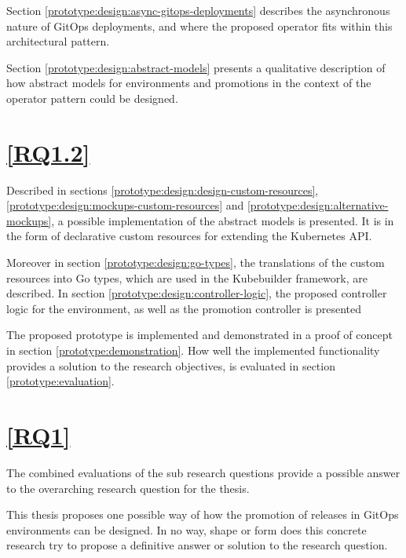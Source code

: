 Section \ref{prototype:design:async-gitops-deployments} describes the asynchronous nature of
GitOps deployments, and where the proposed operator fits within this architectural pattern.

Section \ref{prototype:design:abstract-models} presents a qualitative description 
of how abstract models for environments and promotions in the context of the operator pattern
could be designed.

\section*{\ref{RQ1.2}}

Described in sections \ref{prototype:design:design-custom-resources}, \ref{prototype:design:mockups-custom-resources} and \ref{prototype:design:alternative-mockups},
a possible implementation of the abstract models is presented.
It is in the form of declarative custom resources for extending the Kubernetes API.

Moreover in section \ref{prototype:design:go-types},
the translations of the custom resources into Go types, which are used in the Kubebuilder framework,
are described.
In section \ref{prototype:design:controller-logic},
the proposed controller logic for the environment, as well as the promotion controller is presented

The proposed prototype is implemented and demonstrated in a proof of concept in section
\ref{prototype:demonstration}.
How well the implemented functionality provides a solution to the research objectives,
is evaluated in section \ref{prototype:evaluation}.

\section*{\ref{RQ1}}

The combined evaluations of the sub research questions provide a possible answer to the
overarching research question for the thesis.

This thesis proposes one possible way of how
the promotion of releases in GitOps environments can be designed.
In no way, shape or form does this concrete research try to
propose a definitive answer or solution to the research question.





































